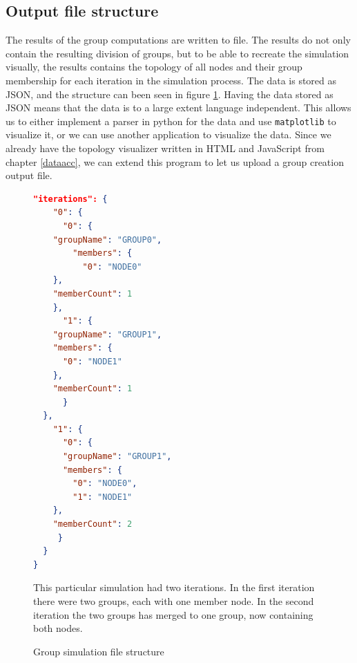 \subsection{Output file structure}
The results of the group computations are written to file. The results do not only contain the resulting division of groups, but to be able to recreate the simulation
visually, the results contains the topology of all nodes and their group membership for each iteration in the simulation process. 
The data is stored as JSON, and the structure can been seen in figure \ref{fig:jsongroup}.
Having the data stored as JSON means that the data is to a large extent language independent.
This allows us to either implement a parser in python for the data and use \verb|matplotlib| to visualize it,
or we can use another application to visualize the data. Since we already have the topology visualizer
written in HTML and JavaScript from chapter \ref{dataacc}, we can extend this program to let us upload a group creation output file. 
		\begin{figure}

\begin{minipage}{\linewidth}
\begin{lstlisting}[language=json]
  "iterations": {
    "0": {
      "0": {
	"groupName": "GROUP0",
        "members": {
          "0": "NODE0"
	},
	"memberCount": 1
    },
      "1": {
	"groupName": "GROUP1",
	"members": {
	  "0": "NODE1"
	},
	"memberCount": 1
      }
  },
    "1": {
      "0": {
	  "groupName": "GROUP1",
	  "members": {
	    "0": "NODE0",
	    "1": "NODE1"
	},
	"memberCount": 2
     }
  }
}
\end{lstlisting}
\end{minipage}

\caption{Group simulation file structure}
\medskip
\small
This particular simulation had two iterations. In the first iteration there were two groups, each with one member node. In the second iteration the two groups has merged to one group, now
containing both nodes. 
\label{fig:jsongroup}
\end{figure}




